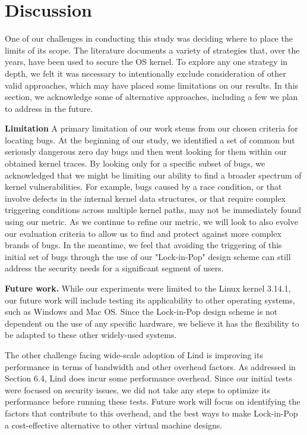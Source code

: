 \section{Discussion}
\label{sec.limitation}

One of our challenges in conducting this study was deciding where to place the
limits of its scope. The literature documents a variety of strategies that, over
the years, have been used to secure the OS kernel. To explore any one strategy
in depth, we felt it was necessary to intentionally exclude consideration of
other valid approaches, which may have placed some limitations on our results.
In this section, we acknowledge some of alternative
approaches, including a few we plan
to address in the future.

\textbf{Limitation }
A primary limitation of our work stems from our chosen criteria for locating
bugs. At the beginning
of our study, we identified a set of common but seriously dangerous zero day bugs
and then went looking for them within our obtained kernel traces. By looking only
for a specific subset of bugs, we acknowledged that we might be limiting our
ability to find a broader spectrum of kernel vulnerabilities. For example, bugs
caused by a race condition, or that involve defects in the internal kernel data
structures, or that require complex triggering conditions across multiple kernel
paths, may not be immediately found using our metric. As we continue to refine
our metric, we will look to also evolve our evaluation
criteria to allow us to find and protect against more complex brands of bugs.
In the meantime, we feel that avoiding the triggering of this initial set of bugs
through the use of our "Lock-in-Pop" design scheme can still address the security
needs for a significant segment of users.

\textbf{Future work.}
While our experiments were limited to the Linux kernel 3.14.1, our future work
will include testing its applicability to other operating systems, such as
Windows and Mac OS. Since the Lock-in-Pop design scheme is not dependent on the use of any
specific hardware, we believe it has the flexibility to be adapted to these other
widely-used systems.

The other challenge facing wide-scale adoption of Lind is improving its
performance in terms of bandwidth and other overhead factors. As addressed in
Section 6.4, Lind does incur some performance overhead. Since our initial tests
were focused on security issues, we did not take any steps to optimize
its performance before running these tests. Future work will focus on identifying
the factors that contribute to this overhead, and the best ways to make Lock-in-Pop
a cost-effective alternative to other virtual machine designs.